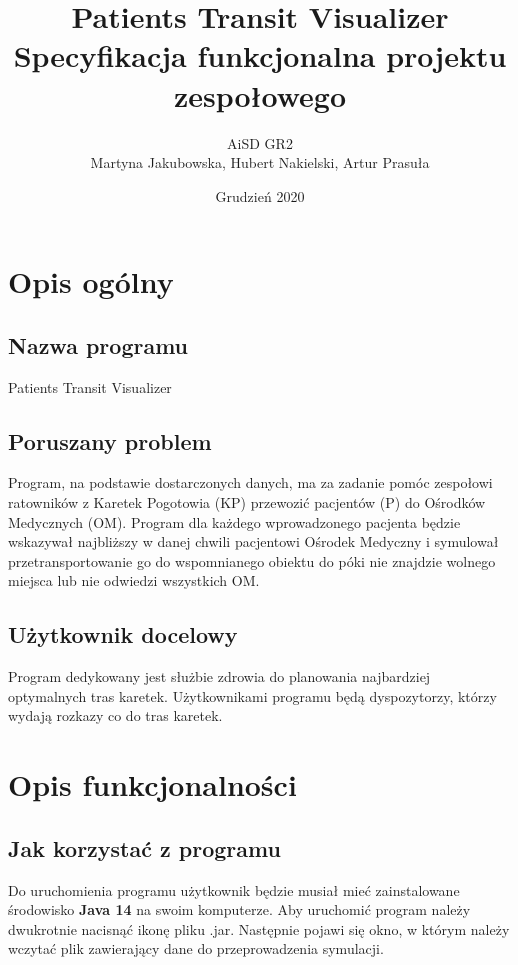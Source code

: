 \documentclass[]{article}
\title{\textbf{Patients Transit Visualizer}\\Specyfikacja funkcjonalna projektu zespołowego}
\author{\small{AiSD GR2}\\Martyna Jakubowska, Hubert Nakielski, Artur Prasuła}
\date{Grudzień 2020}
\begin{document}
    \maketitle


    \section{Opis ogólny}

    \subsection{Nazwa programu}
    Patients Transit Visualizer

    \subsection{Poruszany problem}
    Program, na podstawie dostarczonych danych, ma za zadanie pomóc zespołowi ratowników z Karetek Pogotowia (KP) przewozić pacjentów (P) do Ośrodków Medycznych (OM). Program dla każdego wprowadzonego pacjenta będzie wskazywał najbliższy w danej chwili pacjentowi Ośrodek Medyczny i symulował przetransportowanie go do wspomnianego obiektu do póki nie znajdzie wolnego miejsca lub nie odwiedzi wszystkich OM.

    \subsection{Użytkownik docelowy}
    Program dedykowany jest służbie zdrowia do planowania najbardziej optymalnych tras karetek.
    Użytkownikami programu będą dyspozytorzy, którzy wydają rozkazy co do tras karetek.


    \section{Opis funkcjonalności}

    \subsection{Jak korzystać z programu}
    Do uruchomienia programu użytkownik będzie musiał mieć zainstalowane środowisko \textbf{Java 14} na swoim komputerze.
    Aby uruchomić program należy dwukrotnie nacisnąć ikonę pliku .jar. Następnie pojawi się okno, w którym należy wczytać plik zawierający dane do przeprowadzenia symulacji.
\end{document}
